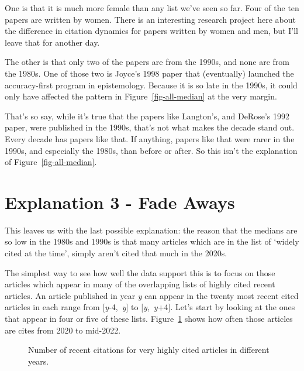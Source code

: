 \documentclass[
  10pt,
  letterpaper,
  DIV=11,
  numbers=noendperiod,
  twoside]{scrartcl}
\begin{document}
One is that it is much more female than any list we've seen so far. Four
of the ten papers are written by women. There is an interesting research
project here about the difference in citation dynamics for papers
written by women and men, but I'll leave that for another day.

The other is that only two of the papers are from the 1990s, and none
are from the 1980s. One of those two is Joyce's 1998 paper that
(eventually) launched the accuracy-first program in epistemology.
Because it is so late in the 1990s, it could only have affected the
pattern in Figure~\ref{fig-all-median} at the very margin.

That's so say, while it's true that the papers like Langton's, and
DeRose's 1992 paper, were published in the 1990s, that's not what makes
the decade stand out. Every decade has papers like that. If anything,
papers like that were rarer in the 1990s, and especially the 1980s, than
before or after. So this isn't the explanation of
Figure~\ref{fig-all-median}.

\section{Explanation 3 - Fade Aways}\label{sec-fade-aways}

This leaves us with the last possible explanation: the reason that the
medians are so low in the 1980s and 1990s is that many articles which
are in the list of `widely cited at the time', simply aren't cited that
much in the 2020s.

The simplest way to see how well the data support this is to focus on
those articles which appear in many of the overlapping lists of highly
cited recent articles. An article published in year \emph{y} can appear
in the twenty most recent cited articles in each range from
{[}\emph{y}-4,~\emph{y}{]} to {[}\emph{y},~\emph{y}+4{]}. Let's start by
looking at the ones that appear in four or five of these lists.
Figure~\ref{fig-four-five-recent} shows how often those articles are
cites from 2020 to mid-2022.

\begin{figure}


\caption{\label{fig-four-five-recent}Number of recent citations for very
highly cited articles in different years.}

\end{figure}%
\end{document}
